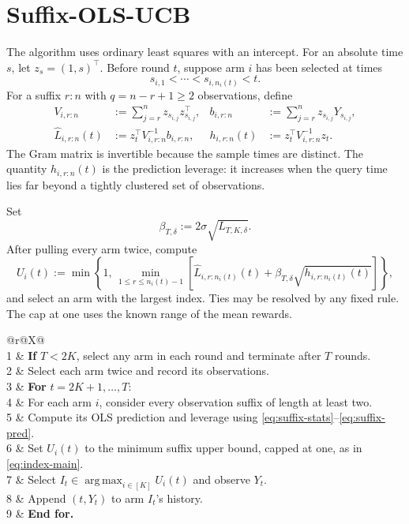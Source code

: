 \documentclass[11pt]{article}
\theoremstyle{remark}
\newcommand{\argmax}{\operatorname*{arg\,max}}
\begin{document}
\section{Suffix-OLS-UCB}\label{sec:algorithm}

The algorithm uses ordinary least squares with an intercept. For an absolute time $s$, let $z_s=(1,s)^\top$. Before round $t$, suppose arm $i$ has been selected at times
\[
s_{i,1}<\cdots<s_{i,n_i(t)}<t.
\]
For a suffix $r:n$ with $q=n-r+1\ge2$ observations, define
\begin{align}
V_{i,r:n}&:=\sum_{j=r}^n z_{s_{i,j}}z_{s_{i,j}}^\top,
&b_{i,r:n}&:=\sum_{j=r}^n z_{s_{i,j}}Y_{s_{i,j}},\label{eq:suffix-stats}\\
\widehat L_{i,r:n}(t)&:=z_t^\top V_{i,r:n}^{-1}b_{i,r:n},
&h_{i,r:n}(t)&:=z_t^\top V_{i,r:n}^{-1}z_t.\label{eq:suffix-pred}
\end{align}
The Gram matrix is invertible because the sample times are distinct. The quantity $h_{i,r:n}(t)$ is the prediction leverage: it increases when the query time lies far beyond a tightly clustered set of observations.

Set
\begin{equation}\label{eq:beta-main}
\beta_{T,\delta}:=2\sigma\sqrt{L_{T,K,\delta}}.
\end{equation}
After pulling every arm twice, compute
\begin{equation}\label{eq:index-main}
U_i(t):=\min\left\{1,\,
\min_{1\le r\le n_i(t)-1}
\left[\widehat L_{i,r:n_i(t)}(t)
+\beta_{T,\delta}\sqrt{h_{i,r:n_i(t)}(t)}\right]\right\},
\end{equation}
and select an arm with the largest index. Ties may be resolved by any fixed rule. The cap at one uses the known range of the mean rewards.

\begin{algorithm}[t]
\caption{Suffix-OLS-UCB}\label{alg:suffix-ols}
\small
\begin{tabularx}{\linewidth}{@{}r@{\quad}X@{}}
\\[0.3em]
1 & \textbf{If} $T<2K$, select any arm in each round and terminate after $T$ rounds.\\
2 & Select each arm twice and record its observations.\\
3 & \textbf{For} $t=2K+1,\ldots,T$:\\
4 & \quad For each arm $i$, consider every observation suffix of length at least two.\\
5 & \quad Compute its OLS prediction and leverage using \eqref{eq:suffix-stats}--\eqref{eq:suffix-pred}.\\
6 & \quad Set $U_i(t)$ to the minimum suffix upper bound, capped at one, as in \eqref{eq:index-main}.\\
7 & \quad Select $I_t\in\argmax_{i\in[K]}U_i(t)$ and observe $Y_t$.\\
8 & \quad Append $(t,Y_t)$ to arm $I_t$'s history.\\
9 & \textbf{End for.}
\end{tabularx}
\end{algorithm}
\end{document}
